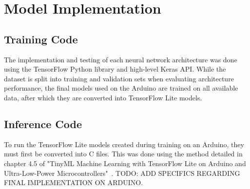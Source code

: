 \section{Model Implementation}\label{sec:model-implementation}
\subsection{Training Code}\label{subsec:training-code}
The implementation and testing of each neural network architecture was done using the TensorFlow Python library and high-level Keras API\@.
While the dataset is split into training and validation sets when evaluating architecture performance, the final models used on the Arduino are trained on all available data, after which they are converted into TensorFlow Lite models.

\subsection{Inference Code}\label{subsec:inference-code}
To run the TensorFlow Lite models created during training on an Arduino, they must first be converted into C files.
This was done using the method detailed in chapter 4.5 of "TinyML Machine Learning with TensorFlow Lite on Arduino and Ultra-Low-Power Microcontrollers"~\cite{warden2020tinyml}.
TODO: ADD SPECIFICS REGARDING FINAL IMPLEMENTATION ON ARDUINO.
